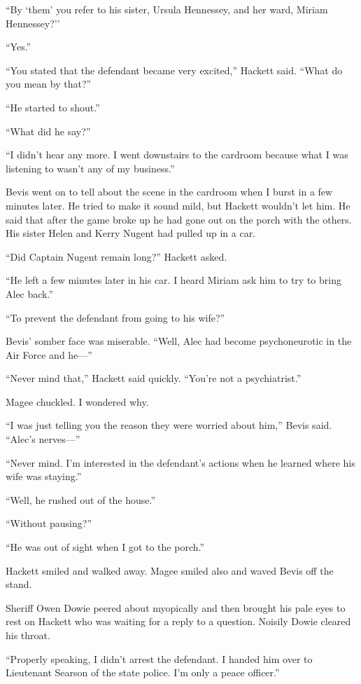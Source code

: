 \documentclass{novel}
\begin{document}
“By ‘them’ you refer to his sister, Ursula Hennessey, and her ward, Miriam Hennessey?’’

“Yes.”

“You stated that the defendant became very excited,” Hackett said. “What do you mean by that?”

“He started to shout.”

“What did he say?”

“I didn’t hear any more. I went downstairs to the cardroom because what I was listening to wasn’t any of my business.”

Bevis went on to tell about the scene in the cardroom when I burst in a few minutes later. He tried to make it sound mild, but Hackett wouldn’t let him. He said that after the game broke up he had gone out on the porch with the others. His sister Helen and Kerry Nugent had pulled up in a car.

“Did Captain Nugent remain long?” Hackett asked.

“He left a few minutes later in his car. I heard Miriam ask him to try to bring Alec back.”

“To prevent the defendant from going to his wife?”

Bevis’ somber face was miserable. “Well, Alec had become psychoneurotic in the Air Force and he—”

“Never mind that,” Hackett said quickly. “You’re not a psychiatrist.”

Magee chuckled. I wondered why.

“I was just telling you the reason they were worried about him,” Bevis said. “Alec’s nerves—”

“Never mind. I’m interested in the defendant’s actions when he learned where his wife was staying.”

“Well, he rushed out of the house.”

“Without pausing?”

“He was out of sight when I got to the porch.”

Hackett smiled and walked away. Magee smiled also and waved Bevis off the stand.

\scenestars

Sheriff Owen Dowie peered about myopically and then brought his pale eyes to rest on Hackett who was waiting for a reply to a question. Noisily Dowie cleared his throat. 

“Properly speaking, I didn’t arrest the defendant. I handed him over to Lieutenant Searson of the state police. I’m only a peace officer.”
\end{document}
